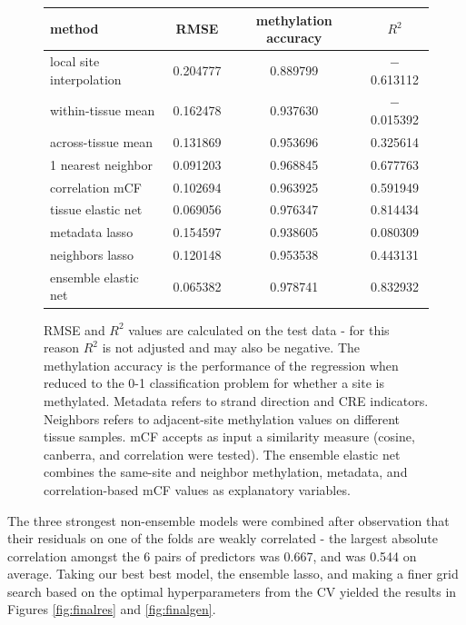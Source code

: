 \documentclass{article} %
\begin{document}
\begin{figure}[H]
    \centering
    \begin{tabular}{l|ccc}
method & RMSE & methylation accuracy & $R^2$ \\ \hline
local site interpolation & 0.204777 & 0.889799 & $-$0.613112 \\
within-tissue mean & 0.162478 & 0.937630 & $-$0.015392 \\
across-tissue mean & 0.131869 & 0.953696 & \phantom{$-$}0.325614 \\
1 nearest neighbor & 0.091203 & 0.968845 & \phantom{$-$}0.677763 \\
correlation mCF & 0.102694 & 0.963925 & \phantom{$-$}0.591949 \\
tissue elastic net & 0.069056 & 0.976347 & \phantom{$-$}0.814434 \\
metadata lasso & 0.154597 & 0.938605 & \phantom{$-$}0.080309 \\
neighbors lasso & 0.120148 & 0.953538 & \phantom{$-$}0.443131 \\

ensemble elastic net & 0.065382 & 0.978741 & \phantom{$-$}0.832932
\end{tabular}
        \caption{RMSE and $R^2$ values are calculated on the test data - for this reason $R^2$ is not adjusted and may also be negative. The methylation accuracy is the performance of the regression when reduced to the 0-1 classification problem for whether a site is methylated. Metadata refers to strand direction and CRE indicators. Neighbors refers to adjacent-site methylation values on different tissue samples. mCF accepts as input a similarity measure (cosine, canberra, and correlation were tested). The ensemble elastic net combines the same-site and neighbor methylation, metadata, and correlation-based mCF values as explanatory variables.}
    \label{fig:cvperf}
\end{figure} 

The three strongest non-ensemble models were combined after observation that their residuals on one of the folds are weakly correlated - the largest absolute correlation amongst the 6 pairs of predictors was 0.667, and was 0.544 on average. Taking our best best model, the ensemble lasso, and making a finer grid search based on the optimal hyperparameters from the CV yielded the results in Figures \ref{fig:finalres} and \ref{fig:finalgen}.
\end{document}
